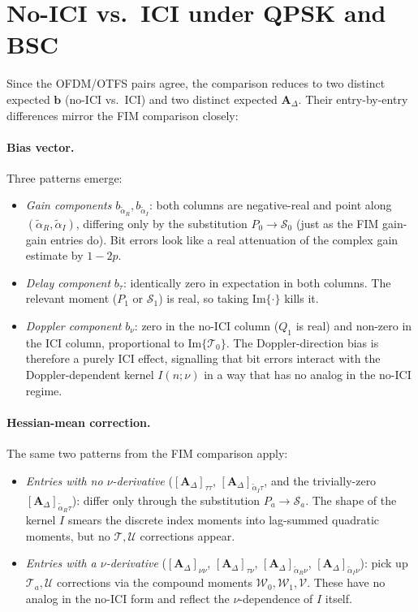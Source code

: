 \documentclass[11pt]{article}
\begin{document}
\section{No-ICI vs.\ ICI under QPSK and BSC}

Since the OFDM/OTFS pairs agree, the comparison reduces to two distinct expected \(\bm{b}\) (no-ICI vs.\ ICI) and two distinct expected \(\bm{A}_\Delta\). Their entry-by-entry differences mirror the FIM comparison closely:

\paragraph{Bias vector.} Three patterns emerge:
\begin{itemize}
    \item \emph{Gain components} \(b_{\tilde{\alpha}_R}, b_{\tilde{\alpha}_I}\): both columns are negative-real and point along \((\tilde{\alpha}_R, \tilde{\alpha}_I)\), differing only by the substitution \(P_0 \to \mathcal{S}_0\) (just as the FIM gain-gain entries do). Bit errors look like a real attenuation of the complex gain estimate by \(1 - 2p\).
    \item \emph{Delay component} \(b_\tau\): identically zero in expectation in both columns. The relevant moment (\(P_1\) or \(\mathcal{S}_1\)) is real, so taking \(\mathrm{Im}\{\cdot\}\) kills it.
    \item \emph{Doppler component} \(b_\nu\): zero in the no-ICI column (\(Q_1\) is real) and non-zero in the ICI column, proportional to \(\mathrm{Im}\{\mathcal{T}_0\}\). The Doppler-direction bias is therefore a purely ICI effect, signalling that bit errors interact with the Doppler-dependent kernel \(I(n;\nu)\) in a way that has no analog in the no-ICI regime.
\end{itemize}

\paragraph{Hessian-mean correction.} The same two patterns from the FIM comparison apply:
\begin{itemize}
    \item \emph{Entries with no \(\nu\)-derivative} (\([\bm{A}_\Delta]_{\tau\tau}\), \([\bm{A}_\Delta]_{\tilde{\alpha}_I\tau}\), and the trivially-zero \([\bm{A}_\Delta]_{\tilde{\alpha}_R\tau}\)): differ only through the substitution \(P_a \to \mathcal{S}_a\). The shape of the kernel \(I\) smears the discrete index moments into lag-summed quadratic moments, but no \(\mathcal{T}, \mathcal{U}\) corrections appear.
    \item \emph{Entries with a \(\nu\)-derivative} (\([\bm{A}_\Delta]_{\nu\nu}\), \([\bm{A}_\Delta]_{\tau\nu}\), \([\bm{A}_\Delta]_{\tilde{\alpha}_R\nu}\), \([\bm{A}_\Delta]_{\tilde{\alpha}_I\nu}\)): pick up \(\mathcal{T}_a, \mathcal{U}\) corrections via the compound moments \(\mathcal{W}_0, \mathcal{W}_1, \mathcal{V}\). These have no analog in the no-ICI form and reflect the \(\nu\)-dependence of \(I\) itself.
\end{itemize}
\end{document}
